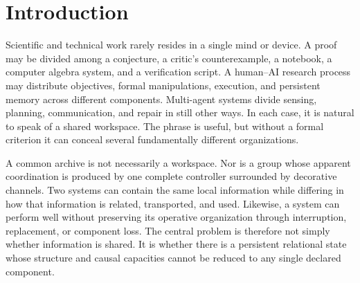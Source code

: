 \begin{abstract}
Exact finite examples show how the same framework applies to human collaboration, human--AI
research loops, and multi-agent control. A review of adjacent work locates the individual
mathematical ingredients in established traditions including distributed cognition, local systems
and sheaves, spectral perturbation, sufficient statistics, structural causal models, frame reconstruction,
system identification, and feedback control. The candidate contribution is therefore
not a new name for any one of these constructions. It is their integration into a single falsifiable
account of persistent relational workspaces and the matched near misses that such an account
must reject. The framework does not infer phenomenal consciousness, personhood, or moral
status from coherence, agency, or self-maintenance.
\end{abstract}

\tableofcontents
\clearpage
{}

\section*{Introduction}

Scientific and technical work rarely resides in a single mind or device. A proof may be divided
among a conjecture, a critic's counterexample, a notebook, a computer algebra system, and a
verification script. A human--AI research process may distribute objectives, formal manipulations,
execution, and persistent memory across different components. Multi-agent systems divide sensing,
planning, communication, and repair in still other ways. In each case, it is natural to speak of a
shared workspace. The phrase is useful, but without a formal criterion it can conceal several
fundamentally different organizations.

A common archive is not necessarily a workspace. Nor is a group whose apparent coordination is
produced by one complete controller surrounded by decorative channels. Two systems can contain
the same local information while differing in how that information is related, transported, and used.
Likewise, a system can perform well without preserving its operative organization through interruption,
replacement, or component loss. The central problem is therefore not simply whether information is
shared. It is whether there is a persistent relational state whose structure and causal capacities cannot
be reduced to any single declared component.


